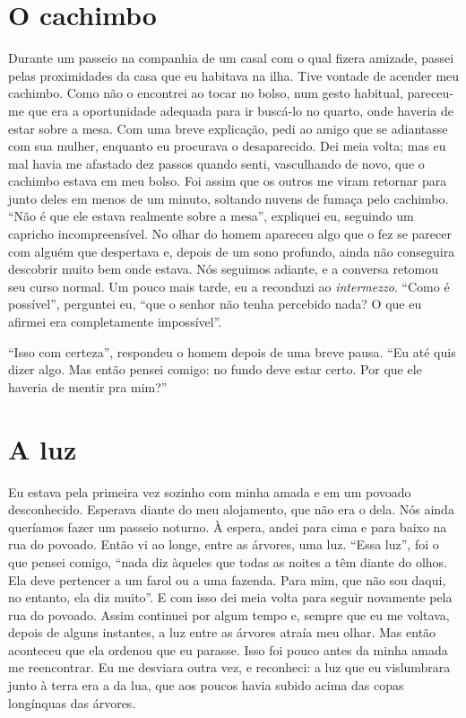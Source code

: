 \section{O cachimbo}

Durante um passeio na companhia de um casal com o qual fizera amizade,
passei pelas proximidades da casa que eu habitava na ilha. Tive vontade
de acender meu cachimbo. Como não o encontrei ao tocar no bolso, num
gesto habitual, pareceu-me que era a oportunidade adequada para ir
buscá-lo no quarto, onde haveria de estar sobre a mesa. Com uma breve
explicação, pedi ao amigo que se adiantasse com sua mulher, enquanto eu
procurava o desaparecido. Dei meia volta; mas eu mal havia me afastado
dez passos quando senti, vasculhando de novo, que o cachimbo estava em
meu bolso. Foi assim que os outros me viram retornar para junto deles em
menos de um minuto, soltando nuvens de fumaça pelo cachimbo. ``Não é que
ele estava realmente sobre a mesa'', expliquei eu, seguindo um capricho
incompreensível. No olhar do homem apareceu algo que o fez se parecer
com alguém que despertava e, depois de um sono profundo, ainda não
conseguira descobrir muito bem onde estava. Nós seguimos adiante, e a
conversa retomou seu curso normal. Um pouco mais tarde, eu a reconduzi
ao \emph{intermezzo}. ``Como é possível'', perguntei eu, ``que o senhor não
tenha percebido nada? O que eu afirmei era completamente impossível''.

``Isso com certeza'', respondeu o homem depois de uma breve pausa. ``Eu até
quis dizer algo. Mas então pensei comigo: no fundo deve estar certo. Por
que ele haveria de mentir pra mim?''

\section{A luz }

Eu estava pela primeira vez sozinho com minha amada e em um povoado
desconhecido. Esperava diante do meu alojamento, que não era o dela. Nós
ainda queríamos fazer um passeio noturno. À espera, andei para cima e
para baixo na rua do povoado. Então vi ao longe, entre as árvores, uma
luz. ``Essa luz'', foi o que pensei comigo, ``nada diz àqueles que todas
as noites a têm diante do olhos. Ela deve pertencer a um farol ou a uma
fazenda. Para mim, que não sou daqui, no entanto, ela diz muito''. E com
isso dei meia volta para seguir novamente pela rua do povoado. Assim
continuei por algum tempo e, sempre que eu me voltava, depois de alguns
instantes, a luz entre as árvores atraía meu olhar. Mas então aconteceu
que ela ordenou que eu parasse. Isso foi pouco antes da minha amada me
reencontrar. Eu me desviara outra vez, e reconheci: a luz que eu
vislumbrara junto à terra era a da lua, que aos poucos havia subido
acima das copas longínquas das árvores.

